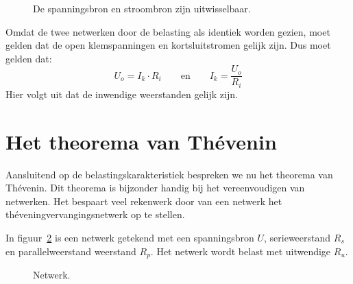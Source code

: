 \begin{figure}[!ht]
\centering
{}
\caption{De spanningsbron en stroombron zijn uitwisselbaar.}
\label{fig:gelbelspanningstroom}
\end{figure}

Omdat de twee netwerken door de belasting als identiek worden gezien, moet gelden dat de open
klemspanningen en kortsluitstromen gelijk zijn. Dus moet gelden dat:
%
\begin{equation}
U_o = I_k\cdot R_i \qquad \text{en} \qquad I_k = \dfrac{U_o}{R_i}
\end{equation}
%
Hier volgt uit dat de inwendige weerstanden gelijk zijn.

\section{Het theorema van Th\'evenin}
Aansluitend op de belastingskarakteristiek bespreken we nu het theorema van Th\'evenin.
Dit theorema is bijzonder handig bij het vereenvoudigen van netwerken. Het bespaart veel
rekenwerk door van een netwerk het th\'eveningvervangingsnetwerk op te stellen.

In figuur~\ref{fig:geltheveninbeginschema} is een netwerk getekend met een spanningsbron $U$,
serieweerstand $R_s$ en parallelweerstand weerstand $R_p$. Het netwerk wordt belast met uitwendige $R_u$.

\begin{figure}[!ht]
\centering
{}
\caption{Netwerk.}
\label{fig:geltheveninbeginschema}
\end{figure}

